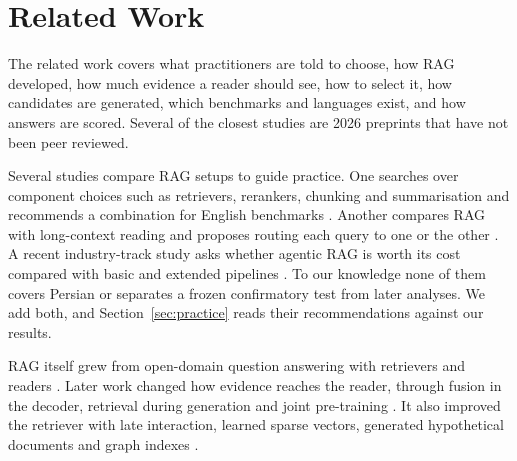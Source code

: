 \section{Related Work}
\label{sec:related}

The related work covers what practitioners are told to choose, how RAG developed, how much evidence a reader should see, how to select it, how candidates are generated, which benchmarks and languages exist, and how answers are scored. Several of the closest studies are 2026 preprints that have not been peer reviewed.

Several studies compare RAG setups to guide practice. One searches over component choices such as retrievers, rerankers, chunking and summarisation and recommends a combination for English benchmarks \citep{wang2024bestpractices}. Another compares RAG with long-context reading and proposes routing each query to one or the other \citep{li2024selfroute}. A recent industry-track study asks whether agentic RAG is worth its cost compared with basic and extended pipelines \citep{ferrazzi2026agentic}. To our knowledge none of them covers Persian or separates a frozen confirmatory test from later analyses. We add both, and Section~\ref{sec:practice} reads their recommendations against our results.

RAG itself grew from open-domain question answering with retrievers and readers \citep{chen2017drqa,lee2019orqa,guu2020realm,karpukhin2020dpr,lewis2020rag}. Later work changed how evidence reaches the reader, through fusion in the decoder, retrieval during generation and joint pre-training \citep{izacard2021fid,borgeaud2022retro,izacard2023atlas}. It also improved the retriever with late interaction, learned sparse vectors, generated hypothetical documents and graph indexes \citep{khattab2020colbert,formal2021splade,gao2023hyde,edge2024graphrag}.

